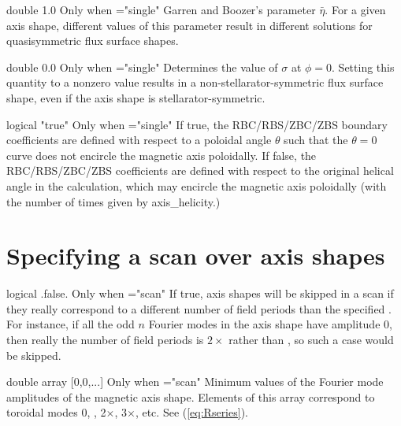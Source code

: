 \myhrule

{double}
{1.0}
{Only when ={\ttfamily "single"}}
{Garren and Boozer's parameter $\bar{\eta}$. For a given axis shape, different values of this parameter result in different solutions for quasisymmetric flux surface shapes.
}

\myhrule

{double}
{0.0}
{Only when ={\ttfamily "single"}}
{Determines the value of $\sigma$ at $\phi=0$. Setting this quantity to a nonzero value results in a non-stellarator-symmetric flux surface shape, even if the axis shape is stellarator-symmetric.
}

\myhrule

{logical}
{{\ttfamily "true"}}
{Only when ={\ttfamily "single"}}
{If true, the RBC/RBS/ZBC/ZBS boundary coefficients are defined with respect to a poloidal angle $\theta$ such that the $\theta=0$ curve does not encircle the magnetic axis poloidally.
If false, the RBC/RBS/ZBC/ZBS coefficients are defined with respect to the original helical angle in the calculation, which may encircle the magnetic axis poloidally (with the number of times given by {\ttfamily axis\_helicity}.)
}

\myhrule


\section{Specifying a scan over axis shapes}

{logical}
{{\ttfamily .false.}}
{Only when ={\ttfamily "scan"}}
{If true, axis shapes will be skipped in a scan if they really correspond to a different number of field periods than the specified . For instance, if all the odd $n$ Fourier modes in the axis shape have amplitude 0, then really the number of field periods is $2\times$  rather than , so such a case would be skipped.}

\myhrule

{double array}
{[0,0,...]}
{Only when ={\ttfamily "scan"}}
{Minimum values of the Fourier mode amplitudes of the magnetic axis shape. Elements of this array correspond to toroidal modes 0, , 2$\times$, 3$\times$, etc.  See (\ref{eq:Rseries}).
}

